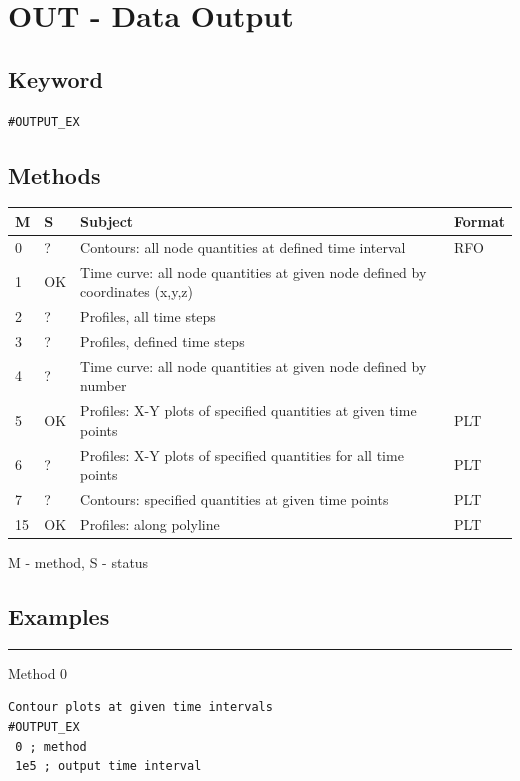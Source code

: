 \section{OUT - Data Output}

\subsection{Keyword}

\begin{verbatim}
#OUTPUT_EX
\end{verbatim}

\subsection{Methods}

\begin{table}[h]
\begin{tabular}{|l|l|l|l|}
\hline
M & S & Subject & Format
\\
\hline
\hline
0 & ? & Contours: all node quantities at defined time interval & RFO
\\
1 & OK & Time curve: all node quantities at given node defined by coordinates (x,y,z) &
\\
2 & ? & Profiles, all time steps &
\\
3 & ? & Profiles, defined time steps &
\\
4 & ? & Time curve: all node quantities at given node defined by number &
\\
5 & OK & Profiles: X-Y plots of specified quantities at given time points & PLT
\\
6 & ? & Profiles: X-Y plots of specified quantities for all time points & PLT
\\
7 & ? & Contours: specified quantities at given time points & PLT
\\
15 & OK & Profiles: along polyline & PLT
\\
\hline
\end{tabular}
\end{table}
M - method, S - status
\normalsize


\subsection{Examples}

\hrule
Method 0
\small
\begin{verbatim}
Contour plots at given time intervals
#OUTPUT_EX
 0 ; method
 1e5 ; output time interval
\end{verbatim}
\normalsize

